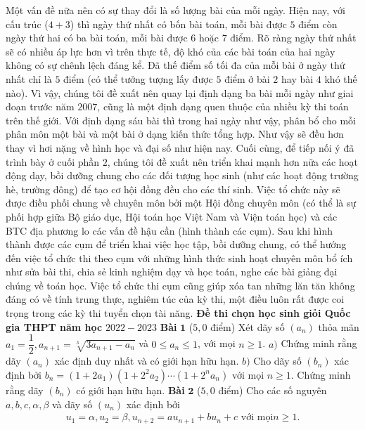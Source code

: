 \begin{multicols}{2}
	Một vấn đề nữa nên có sự thay đổi là số lượng bài của mỗi ngày. Hiện nay, với cấu trúc ($4+3$) thì ngày thứ nhất có bốn bài toán, mỗi bài được $5$ điểm còn ngày thứ hai có ba bài toán, mỗi bài được $6$ hoặc $7$ điểm. Rõ ràng ngày thứ nhất sẽ có nhiều áp lực hơn vì trên thực tế, độ khó của các bài toán của hai ngày không có sự chênh lệch đáng kể. Đã thế điểm số tối đa của mỗi bài ở ngày thứ nhất chỉ là $5$ điểm (có thể tưởng tượng lấy được $5$ điểm ở bài $2$ hay bài $4$ khó thế nào). Vì vậy, chúng tôi đề xuất nên quay lại định dạng ba bài mỗi ngày như giai đoạn trước năm $2007$, cũng là một định dạng quen thuộc của nhiều kỳ thi toán trên thế giới. Với định dạng sáu bài thì trong hai ngày như vậy, phân bổ cho mỗi phân môn một bài và một bài ở dạng kiến thức tổng hợp. Như vậy sẽ đều hơn thay vì hơi nặng về hình học và đại số như hiện nay. 
	\vskip 0.1cm
	Cuối cùng, để tiếp nối ý đã trình bày ở cuối phần $2$, chúng tôi đề xuất nên triển khai mạnh hơn nữa các hoạt động dạy, bồi dưỡng chung cho các đối tượng học sinh (như các hoạt động trường hè, trường đông) để tạo cơ hội đồng đều cho các thí sinh. Việc tổ chức này sẽ được điều phối chung về chuyên môn bởi một Hội đồng chuyên môn (có thể là sự phối hợp giữa Bộ giáo dục, Hội toán học Việt Nam và Viện toán học) và các BTC địa phương lo các vấn đề hậu cần (hình thành các cụm). 
	\vskip 0.1cm
	Sau khi hình thành được các cụm để triển khai việc học tập, bồi dưỡng chung, có thể hướng đến việc tổ chức thi theo cụm với những hình thức sinh hoạt chuyên môn bổ ích như sửa bài thi, chia sẻ kinh nghiệm dạy và học toán, nghe các bài giảng đại chúng về toán học. Việc tổ chức thi cụm cũng giúp xóa tan những lăn tăn không đáng có về tính trung thực, nghiêm túc của kỳ thi, một điều luôn rất được coi trọng trong các kỳ thi tuyển chọn tài năng. 
	\vskip 0.1cm
	\textbf{Đề thi chọn học sinh giỏi Quốc gia THPT năm học} $2022-2023$
	\vskip 0.1cm
	\textbf{Bài} $\pmb{1}$ ($5{,}0$ điểm) Xét dãy số $\left(a_n\right)$ thỏa mãn $a_1 = \dfrac{1}{2}, a_{n+1} = \sqrt[3]{3a_{n+1} - a_n}$ và $0 \le a_n \le 1$, với mọi $n \ge 1$.
	\vskip 0.1cm
	$a)$ Chứng minh rằng dãy $(a_n)$ xác định duy nhất và có giới hạn hữu hạn.
	\vskip 0.1cm
	$b)$ Cho dãy số $\left(b_n\right)$ xác định bởi $b_n = (1+ 2a_1)\left(1 + 2^2a_2\right)\cdots\left(1 + 2^na_n\right)$ với mọi $n \ge 1$. Chứng minh rằng dãy $\left(b_n\right)$ có giới hạn hữu hạn.
	\vskip 0.1cm
	\textbf{Bài} $\pmb{2}$ ($5{,}0$ điểm) Cho các số nguyên $a,b,c, \alpha,\beta$ và dãy số $\left(u_n\right)$ xác định bởi 
	\begin{align*}
		u_1 = \alpha, u_2 = \beta, u_{n+2} = au_{n+1} + bu_n + c \text{ với mọi} n \ge 1.

\end{align*}
\end{multicols}
